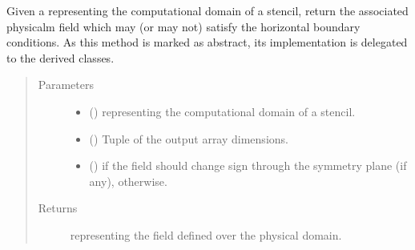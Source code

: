 \documentclass[letterpaper,10pt,english]{sphinxmanual}
\begin{document}
\begin{fulllineitems}
\begin{fulllineitems}
\begin{quote}
\begin{description}
\end{description}\end{quote}

\end{fulllineitems}


\begin{fulllineitems}
\label{\detokenize{api:tasmania.dycore.horizontal_boundary.HorizontalBoundary.from_computational_to_physical_domain}}
Given a  representing the computational domain of a stencil, return the
associated physicalm field which may (or may not) satisfy the horizontal boundary conditions.
As this method is marked as abstract, its implementation is delegated to the derived classes.
\begin{quote}\begin{description}
\item[{Parameters}] \leavevmode\begin{itemize}
\item {} 
 () \textendash{}  representing the computational domain of a stencil.

\item {} 
 () \textendash{} Tuple of the output array dimensions.

\item {} 
 () \textendash{}  if the field should change sign through the symmetry plane (if any),  otherwise.

\end{itemize}

\item[{Returns}] \leavevmode
{} representing the field defined over the physical domain.


\end{description}
\end{quote}
\end{fulllineitems}
\end{fulllineitems}
\end{document}
